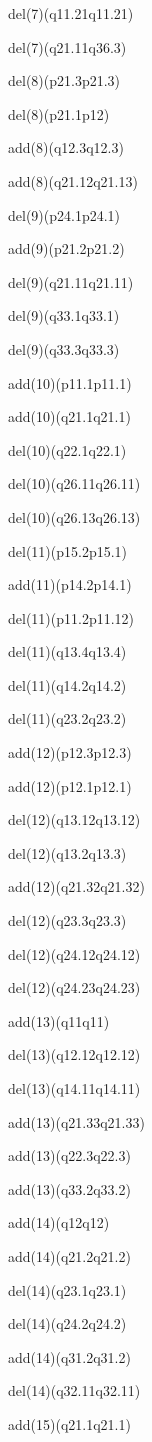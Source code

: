 \documentclass[]{article}
\begin{document}
del(7)(q11.21q11.21)

del(7)(q21.11q36.3)

del(8)(p21.3p21.3)

del(8)(p21.1p12)

add(8)(q12.3q12.3)

add(8)(q21.12q21.13)

del(9)(p24.1p24.1)

add(9)(p21.2p21.2)

del(9)(q21.11q21.11)

del(9)(q33.1q33.1)

del(9)(q33.3q33.3)

add(10)(p11.1p11.1)

add(10)(q21.1q21.1)

del(10)(q22.1q22.1)

del(10)(q26.11q26.11)

del(10)(q26.13q26.13)

del(11)(p15.2p15.1)

add(11)(p14.2p14.1)

del(11)(p11.2p11.12)

del(11)(q13.4q13.4)

del(11)(q14.2q14.2)

del(11)(q23.2q23.2)

add(12)(p12.3p12.3)

add(12)(p12.1p12.1)

del(12)(q13.12q13.12)

del(12)(q13.2q13.3)

add(12)(q21.32q21.32)

del(12)(q23.3q23.3)

del(12)(q24.12q24.12)

del(12)(q24.23q24.23)

add(13)(q11q11)

del(13)(q12.12q12.12)

del(13)(q14.11q14.11)

add(13)(q21.33q21.33)

add(13)(q22.3q22.3)

add(13)(q33.2q33.2)

add(14)(q12q12)

add(14)(q21.2q21.2)

del(14)(q23.1q23.1)

del(14)(q24.2q24.2)

add(14)(q31.2q31.2)

del(14)(q32.11q32.11)

add(15)(q21.1q21.1)
\end{document}
